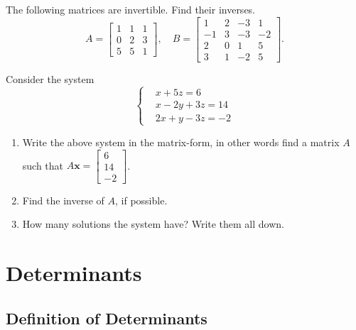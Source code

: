 \begin{problem}
\label{2009_a8_1}
The following matrices are invertible. Find their inverses.\\
$$
A=\left[\begin{array}{ccc}1&1&1\\ 0&2&3\\ 5&5&1\end{array}\right], \quad
B=\left[\begin{array}{cccc}1&2&-3&1\\ -1&3&-3&-2\\ 2&0&1&5\\ 3&1&-2&5 \end{array}\right].
$$
\end{problem}

\begin{problem}
\label{2009_a8_2}
Consider the system
$$ \left\{
\begin{array}{cc}
&x+5z=6\\
&x-2y+3z=14\\
&2x+y-3z=-2
\end{array}
\right.
$$
\begin{enumerate}
\item Write the above system in the matrix-form, in other words  find a matrix $A$ such that  $A\mathbf{x}=\left[\begin{array}{c}6\\14\\ -2 \end{array}\right]$.
\item Find the inverse of $A$, if possible.
\item How many solutions the system have? Write them all down.
\end{enumerate}
\end{problem}

\section{Determinants}

\subsection{Definition of Determinants}

